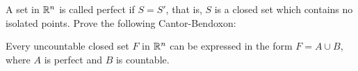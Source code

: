 A set in $\mathbb{R}^n$ is called perfect if $S = S'$, that is, $S$ is a closed set which contains no isolated points. Prove the following Cantor-Bendoxon: 

Every uncountable closed set $F$ in $\mathbb{R}^n$ can be expressed in the form $F = A \cup B$, where $A$ is perfect and $B$ is countable.
